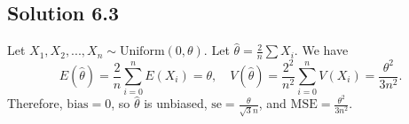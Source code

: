 \subsection*{Solution 6.3}

Let $X_1, X_2, ..., X_n \sim \mathrm{Uniform}(0, \theta)$.
Let $\hat{\theta} = \frac{2}{n} \sum X_i$.
We have
\begin{equation*}
    E(\hat{\theta}) = \frac{2}{n} \sum_{i=0}^n E(X_i)
        = \theta, \quad
    V(\hat{\theta}) = \frac{2^2}{n^2} \sum_{i = 0}^n V(X_i)
        = \frac{\theta^2}{3n^2}.
\end{equation*}
Therefore, $\mathrm{bias} = 0$, so $\hat{\theta}$ is unbiased, $\mathrm{se} = \frac{\theta}{\sqrt{3}n}$, and $\mathrm{MSE} = \frac{\theta^2}{3n^2}$.
